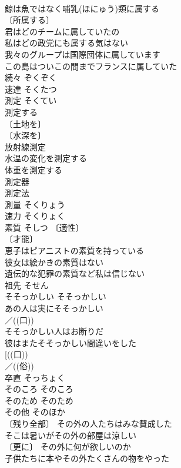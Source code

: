 \documentclass[8pt]{extreport}
\begin{document}
\begin{CJK}{UTF8}{min}
\\	鯨は魚ではなく哺乳(ほにゅう)類に属する 
\\	〔所属する〕
\\	君はどのチームに属していたの 
\\	私はどの政党にも属する気はない 
\\	我々のグループは国際団体に属しています 
\\	この島はついこの間までフランスに属していた 
\\	続々	ぞくぞく	
\\	速達	そくたつ	
\\	測定	そくてい	
\\	測定する 
\\	〔土地を〕
\\	〔水深を〕
\\	放射線測定 
\\	水温の変化を測定する 
\\	体重を測定する 
\\	測定器 
\\	測定法 
\\	測量	そくりょう	
\\	速力	そくりょく	
\\	素質	そしつ	〔適性〕
\\	〔才能〕
\\	恵子はピアニストの素質を持っている 
\\	彼女は絵かきの素質はない 
\\	遺伝的な犯罪の素質など私は信じない 
\\	祖先	そせん	
\\	そそっかしい	そそっかしい	
\\	あの人は実にそそっかしい 
\\	／((口)) 
\\	そそっかしい人はお断りだ 
\\	彼はまたそそっかしい間違いをした 
\\	[((口)) 
\\	／((俗)) 
\\	卒直	そっちょく	
\\	そのころ	そのころ	
\\	そのため	そのため	
\\	その他	そのほか	
\\	〔残り全部〕 その外の人たちはみな賛成した 
\\	そこは暑いがその外の部屋は涼しい 
\\	〔更に〕 その外に何が欲しいのか 
\\	子供たちに本やその外たくさんの物をやった 

\end{CJK}
\end{document}
